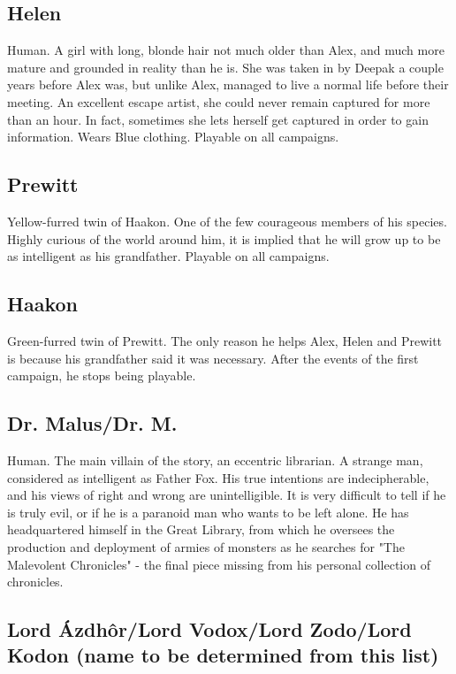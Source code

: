 \documentclass{gd-document}
\begin{document}
\subsection{Helen}

Human. A girl with long, blonde hair not much older than Alex, and
much more mature and grounded in reality than he is. She was taken in
by Deepak a couple years before Alex was, but unlike Alex, managed to
live a normal life before their meeting. An excellent escape artist,
she could never remain captured for more than an hour. In fact,
sometimes she lets herself get captured in order to gain
information. Wears Blue clothing. Playable on all campaigns.

\subsection{Prewitt}

Yellow-furred twin of Haakon. One of the few courageous members of his
species. Highly curious of the world around him, it is implied that he
will grow up to be as intelligent as his grandfather. Playable on all
campaigns.

\subsection{Haakon}

Green-furred twin of Prewitt. The only reason he helps Alex, Helen and
Prewitt is because his grandfather said it was necessary. After the
events of the first campaign, he stops being playable.

\subsection{Dr. Malus/Dr. M.}

Human. The main villain of the story, an eccentric librarian. A
strange man, considered as intelligent as Father Fox. His true
intentions are indecipherable, and his views of right and wrong are
unintelligible. It is very difficult to tell if he is truly evil, or
if he is a paranoid man who wants to be left alone. He has
headquartered himself in the Great Library, from which he oversees the
production and deployment of armies of monsters as he searches for
"The Malevolent Chronicles" - the final piece missing from his
personal collection of chronicles.

\subsection{Lord Ázdhôr/Lord Vodox/Lord Zodo/Lord Kodon (name to be
  determined from this list)}
\end{document}
